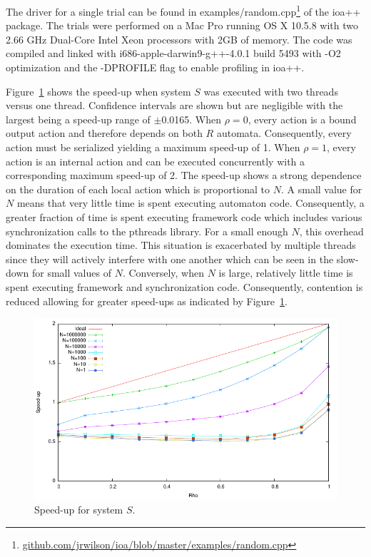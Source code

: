 The driver for a single trial can be found in examples/random.cpp\footnote{\url{github.com/jrwilson/ioa/blob/master/examples/random.cpp}} of the ioa++ package.
The trials were performed on a Mac Pro running OS X 10.5.8 with two 2.66 GHz Dual-Core Intel Xeon processors with 2GB of memory.
The code was compiled and linked with i686-apple-darwin9-g++-4.0.1 build 5493 with -O2 optimization and the -DPROFILE flag to enable profiling in ioa++.

Figure~\ref{speed_up} shows the speed-up when system $S$ was executed with two threads versus one thread.
Confidence intervals are shown but are negligible with the largest being a speed-up range of $\pm$0.0165.
When $\rho = 0$, every action is a bound output action and therefore depends on both $R$ automata.
Consequently, every action must be serialized yielding a maximum speed-up of 1.
When $\rho = 1$, every action is an internal action and can be executed concurrently with a corresponding maximum speed-up of 2.
The speed-up shows a strong dependence on the duration of each local action which is proportional to $N$.
A small value for $N$ means that very little time is spent executing automaton code.
Consequently, a greater fraction of time is spent executing framework code which includes various synchronization calls to the pthreads library.
For a small enough $N$, this overhead dominates the execution time.
This situation is exacerbated by multiple threads since they will actively interfere with one another which can be seen in the slow-down for small values of $N$.
Conversely, when $N$ is large, relatively little time is spent executing framework and synchronization code.
Consequently, contention is reduced allowing for greater speed-ups as indicated by Figure~\ref{speed_up}.

\begin{figure}
\center
\includegraphics[width=.72\columnwidth]{speed_up}
\caption{Speed-up for system $S$.\label{speed_up}}
\end{figure}

